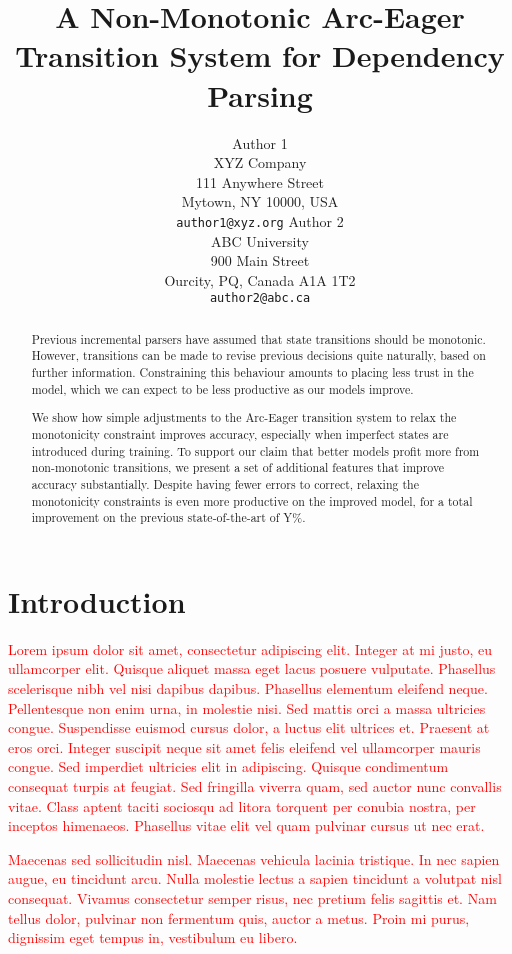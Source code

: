\documentclass[11pt,letterpaper]{article}
\title{A Non-Monotonic Arc-Eager Transition System for Dependency Parsing}
\author{Author 1\\
	    XYZ Company\\
	    111 Anywhere Street\\
	    Mytown, NY 10000, USA\\
	    {\tt author1@xyz.org}
	  \And
	Author 2\\
  	ABC University\\
  	900 Main Street\\
  	Ourcity, PQ, Canada A1A 1T2\\
  {\tt author2@abc.ca}}
\date{}
\newcommand{\note}[1]{\textcolor{red}{#1}}
\begin{document}
\maketitle
\begin{abstract}
    Previous incremental parsers have assumed that state transitions
    should be monotonic. However, transitions can be made to revise
    previous decisions quite naturally, based on further information.
    Constraining this behaviour amounts
    to placing less trust in the model, which we can expect to be less productive as
    our models improve.

    We show how simple adjustments to the Arc-Eager transition system to relax the
    monotonicity constraint improves accuracy, especially when imperfect
    states are introduced during training. To support our claim that better models
    profit more from non-monotonic transitions, we present a set of
    additional features that improve accuracy substantially. Despite having fewer errors
    to correct, relaxing the monotonicity constraints is even more productive on
    the improved model, for a total improvement on the previous state-of-the-art of
    Y\%.
\end{abstract}

\section{Introduction}
\note{Lorem ipsum dolor sit amet, consectetur adipiscing elit. Integer at mi justo, eu ullamcorper elit. Quisque aliquet massa eget lacus posuere vulputate. Phasellus scelerisque nibh vel nisi dapibus dapibus. Phasellus elementum eleifend neque. Pellentesque non enim urna, in molestie nisi. Sed mattis orci a massa ultricies congue. Suspendisse euismod cursus dolor, a luctus elit ultrices et. Praesent at eros orci. Integer suscipit neque sit amet felis eleifend vel ullamcorper mauris congue. Sed imperdiet ultricies elit in adipiscing. Quisque condimentum consequat turpis at feugiat. Sed fringilla viverra quam, sed auctor nunc convallis vitae. Class aptent taciti sociosqu ad litora torquent per conubia nostra, per inceptos himenaeos. Phasellus vitae elit vel quam pulvinar cursus ut nec erat.}

\note{Maecenas sed sollicitudin nisl. Maecenas vehicula lacinia tristique. In nec sapien augue, eu tincidunt arcu. Nulla molestie lectus a sapien tincidunt a volutpat nisl consequat. Vivamus consectetur semper risus, nec pretium felis sagittis et. Nam tellus dolor, pulvinar non fermentum quis, auctor a metus. Proin mi purus, dignissim eget tempus in, vestibulum eu libero.}
\end{document}
